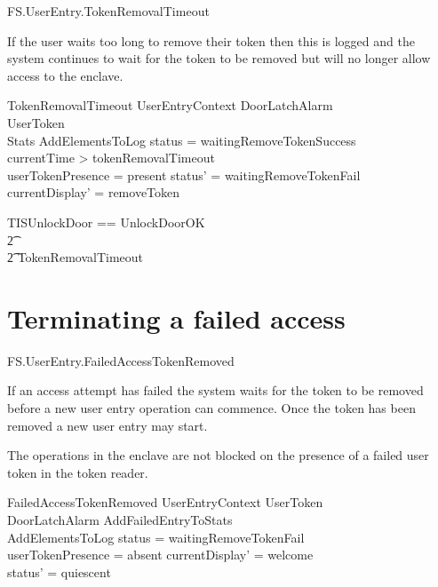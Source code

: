 \begin{traceunit}{FS.UserEntry.TokenRemovalTimeout}
\end{traceunit}

If the user waits too long to remove their token then this is logged
and the system continues to wait for the token to be removed but will
no longer allow access to the enclave.

\begin{schema}{TokenRemovalTimeout}
        UserEntryContext
\also
        \Xi DoorLatchAlarm
\\      \Xi UserToken
\\      \Xi Stats       
\also
        AddElementsToLog
\where
        status = waitingRemoveTokenSuccess
\\      currentTime > tokenRemovalTimeout 
\\      userTokenPresence = present
\also
        status' = waitingRemoveTokenFail
\\      currentDisplay' = removeToken
\end{schema}


\begin{zed}
        TISUnlockDoor == UnlockDoorOK 
\\      \t2 \lor [ WaitingTokenRemoval |status =
waitingRemoveTokenSuccess ]
\\      \t2 \lor TokenRemovalTimeout
\end{zed}
 
\section{Terminating a failed access}

\begin{traceunit}{FS.UserEntry.FailedAccessTokenRemoved}
\end{traceunit}

If an access attempt has failed the system waits for the token to be
removed before a new user entry operation can commence. Once the token has been
removed a new user entry may start.

The operations in the enclave are not blocked on the presence of a
failed user token in the token reader. 

\begin{schema}{FailedAccessTokenRemoved}
        UserEntryContext
\also
	\Xi UserToken
\\      \Xi DoorLatchAlarm
\also
        AddFailedEntryToStats
\\      AddElementsToLog
\where
        status = waitingRemoveTokenFail
\\      userTokenPresence = absent
\also
        currentDisplay' = welcome
\\      status' = quiescent
\end{schema}

